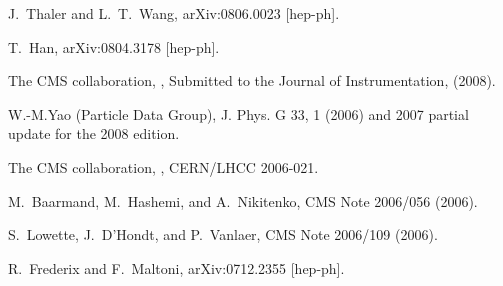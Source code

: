 \documentclass{cimento}
\begin{document}
\begin{thebibliography}{0}

 J.~Thaler and L.~T.~Wang,
  arXiv:0806.0023 [hep-ph].

 T.~Han,
  arXiv:0804.3178 [hep-ph].

 The CMS collaboration, ,
Submitted to the Journal of Instrumentation, (2008).

 W.-M.Yao \etal (Particle Data Group), 
J. Phys. G 33, 1 (2006) and 2007 partial update for the 2008 edition.

 The CMS collaboration, ,
CERN/LHCC 2006-021.

 M.~Baarmand, M.~Hashemi, and A.~Nikitenko, CMS Note 2006/056 (2006).


 S.~Lowette, J.~D'Hondt, and P.~Vanlaer, CMS Note 2006/109 (2006).

 R.~Frederix and F.~Maltoni,
  arXiv:0712.2355 [hep-ph].


\end{thebibliography}
\end{document}
